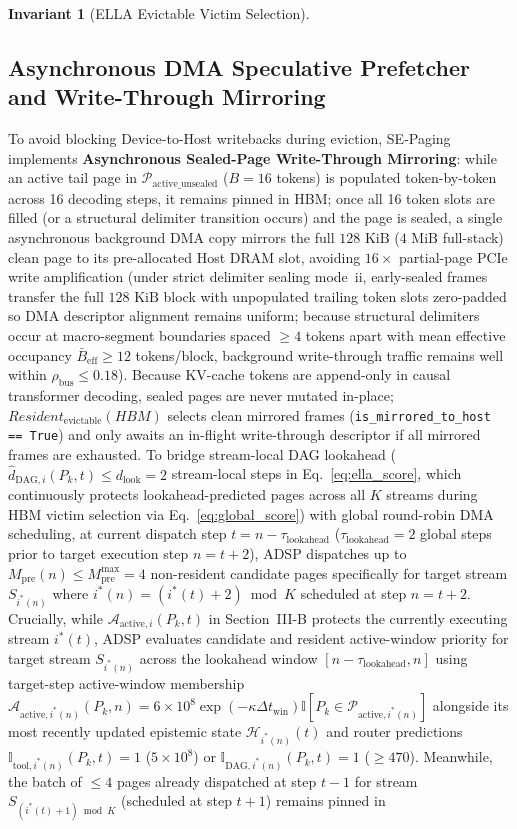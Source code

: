\documentclass[conference,10pt]{IEEEtran}
\newtheorem{invariant}{Invariant}
\begin{document}
\begin{invariant}[ELLA Evictable Victim Selection]
\end{invariant}

\subsection{Asynchronous DMA Speculative Prefetcher and Write-Through Mirroring}
To avoid blocking Device-to-Host writebacks during eviction, SE-Paging implements \textbf{Asynchronous Sealed-Page Write-Through Mirroring}: while an active tail page in $\mathcal{P}_{\text{active\_unsealed}}$ ($B=16$ tokens) is populated token-by-token across 16 decoding steps, it remains pinned in HBM; once all 16 token slots are filled (or a structural delimiter transition occurs) and the page is sealed, a single asynchronous background DMA copy mirrors the full $128\text{ KiB}$ ($4\text{ MiB}$ full-stack) clean page to its pre-allocated Host DRAM slot, avoiding $16\times$ partial-page PCIe write amplification (under strict delimiter sealing mode~ii, early-sealed frames transfer the full $128\text{ KiB}$ block with unpopulated trailing token slots zero-padded so DMA descriptor alignment remains uniform; because structural delimiters occur at macro-segment boundaries spaced $\ge 4$ tokens apart with mean effective occupancy $\bar{B}_{\text{eff}} \ge 12$ tokens/block, background write-through traffic remains well within $\rho_{\text{bus}} \le 0.18$). Because KV-cache tokens are append-only in causal transformer decoding, sealed pages are never mutated in-place; $\textit{Resident}_{\text{evictable}}(\textit{HBM})$ selects clean mirrored frames (\texttt{is\_mirrored\_to\_host == True}) and only awaits an in-flight write-through descriptor if all mirrored frames are exhausted. To bridge stream-local DAG lookahead ($\hat{d}_{\text{DAG},i}(P_k, t) \le d_{\text{look}} = 2$ stream-local steps in Eq.~\eqref{eq:ella_score}, which continuously protects lookahead-predicted pages across all $K$ streams during HBM victim selection via Eq.~\eqref{eq:global_score}) with global round-robin DMA scheduling, at current dispatch step $t = n - \tau_{\text{lookahead}}$ ($\tau_{\text{lookahead}} = 2$ global steps prior to target execution step $n = t + 2$), ADSP dispatches up to $M_{\text{pre}}(n) \le M_{\text{pre}}^{\max} = 4$ non-resident candidate pages specifically for target stream $S_{i^*(n)}$ where $i^*(n) = (i^*(t)+2)\bmod K$ scheduled at step $n = t + 2$. Crucially, while $\mathcal{A}_{\text{active}, i}(P_k, t)$ in Section~III-B protects the currently executing stream $i^*(t)$, ADSP evaluates candidate and resident active-window priority for target stream $S_{i^*(n)}$ across the lookahead window $[n - \tau_{\text{lookahead}}, n]$ using target-step active-window membership $\mathcal{A}_{\text{active}, i^*(n)}(P_k, n) = 6 \times 10^8\exp(-\kappa \Delta t_{\text{win}})\mathbb{I}[P_k \in \mathcal{P}_{\text{active}, i^*(n)}]$ alongside its most recently updated epistemic state $\mathcal{H}_{i^*(n)}(t)$ and router predictions $\mathbb{I}_{\text{tool},i^*(n)}(P_k, t) = 1$ ($5 \times 10^8$) or $\mathbb{I}_{\text{DAG},i^*(n)}(P_k, t) = 1$ ($\ge 470$). Meanwhile, the batch of $\le 4$ pages already dispatched at step $t - 1$ for stream $S_{(i^*(t)+1)\bmod K}$ (scheduled at step $t + 1$) remains pinned in 
\end{document}
